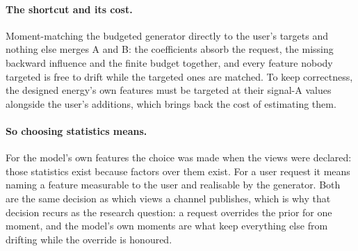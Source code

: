 \documentclass[11pt]{article}
\newcommand{\1}{\mathds{1}}
\begin{document}
\paragraph{The shortcut and its cost.} Moment-matching the budgeted
generator directly to the user's targets and nothing else merges A and B:
the coefficients absorb the request, the missing backward influence and
the finite budget together, and every feature nobody targeted is free to
drift while the targeted ones are matched. To keep correctness, the
designed energy's own features must be targeted at their signal-A values
alongside the user's additions, which brings back the cost of estimating
them.

\paragraph{So choosing statistics means.} For the model's own features the
choice was made when the views were declared: those statistics exist
because factors over them exist. For a user request it means naming a
feature measurable to the user and realisable by the generator. Both are
the same decision as which views a channel publishes, which is why that
decision recurs as the research question: a request overrides the prior
for one moment, and the model's own moments are what keep everything else
from drifting while the override is honoured.
\end{document}
